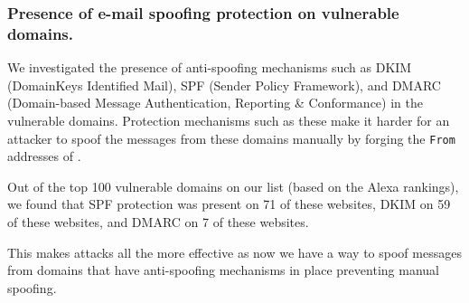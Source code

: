 

\subsubsection{Presence of e-mail spoofing protection on vulnerable domains.}
We investigated the presence of anti-spoofing mechanisms such as DKIM (DomainKeys Identified Mail), SPF (Sender Policy Framework), and DMARC (Domain-based Message Authentication, Reporting \& Conformance) in the vulnerable domains. Protection mechanisms such as these make it harder for an attacker to spoof the \email messages from these domains manually by forging the \lstinline{From} addresses of \emails.

Out of the top 100 vulnerable domains on our list (based on the Alexa rankings), we found that SPF protection was present on 71 of these websites, DKIM on 59 of these websites, and DMARC on 7 of these websites.

This makes \ehi attacks all the more effective as now we have a way to spoof messages from domains that have anti-spoofing mechanisms in place preventing manual spoofing.
